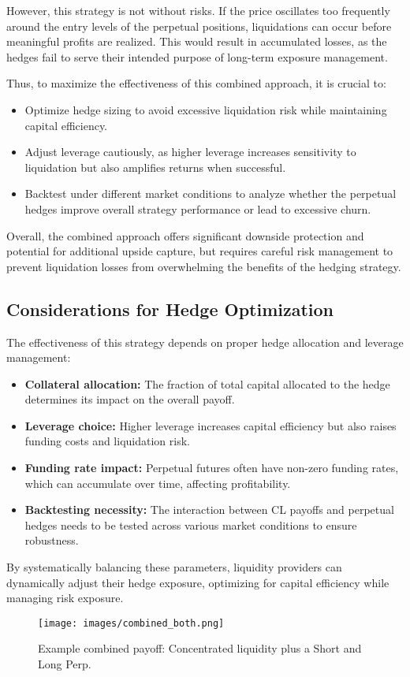 \documentclass[12pt]{article}
\begin{document}
However, this strategy is not without risks. If the price oscillates too frequently around the entry levels of the perpetual positions, liquidations can occur before meaningful profits are realized. This would result in accumulated losses, as the hedges fail to serve their intended purpose of long-term exposure management. 

\medskip

Thus, to maximize the effectiveness of this combined approach, it is crucial to:
\begin{itemize}
    \item Optimize hedge sizing to avoid excessive liquidation risk while maintaining capital efficiency.
    \item Adjust leverage cautiously, as higher leverage increases sensitivity to liquidation but also amplifies returns when successful.
    \item Backtest under different market conditions to analyze whether the perpetual hedges improve overall strategy performance or lead to excessive churn.
\end{itemize}

Overall, the combined approach offers significant downside protection and potential for additional upside capture, but requires careful risk management to prevent liquidation losses from overwhelming the benefits of the hedging strategy.

\subsection{Considerations for Hedge Optimization}

The effectiveness of this strategy depends on proper hedge allocation and leverage management:
\begin{itemize}
    \item \textbf{Collateral allocation:} The fraction of total capital allocated to the hedge determines its impact on the overall payoff.
    \item \textbf{Leverage choice:} Higher leverage increases capital efficiency but also raises funding costs and liquidation risk.
    \item \textbf{Funding rate impact:} Perpetual futures often have non-zero funding rates, which can accumulate over time, affecting profitability.
    \item \textbf{Backtesting necessity:} The interaction between CL payoffs and perpetual hedges needs to be tested across various market conditions to ensure robustness.
\end{itemize}

By systematically balancing these parameters, liquidity providers can dynamically adjust their hedge exposure, optimizing for capital efficiency while managing risk exposure.

\begin{figure}[htb]
    \centering
    \texttt{[image: images/combined\_both.png]}
    \caption{Example combined payoff: Concentrated liquidity plus a Short and Long Perp.}
    \label{fig:combined-short}
\end{figure}

\newpage
\end{document}

